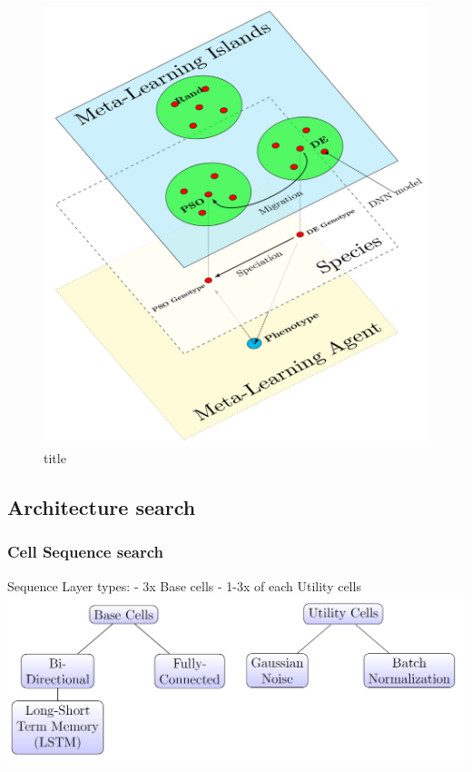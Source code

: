 \documentclass[11pt]{article}
\makeatletter
\def\maxwidth{\ifdim\Gin@nat@width>\linewidth\linewidth
    \else\Gin@nat@width\fi}
\let\Oldincludegraphics\includegraphics
\renewcommand{\includegraphics}[1]{\Oldincludegraphics[width=.8\maxwidth]{#1}}
\makeatother
\begin{document}
    \begin{figure}
\centering
\includegraphics{pics/metaLearningIslandSpeciation.png}
\caption{title}
\end{figure}

    \hypertarget{architecture-search}{%
\subsection{Architecture search}\label{architecture-search}}

    \hypertarget{cell-sequence-search}{%
\subsubsection{Cell Sequence search}\label{cell-sequence-search}}

    Sequence Layer types: - 3x Base cells - 1-3x of each Utility cells
\includegraphics{pics/cells.png}
\end{document}

